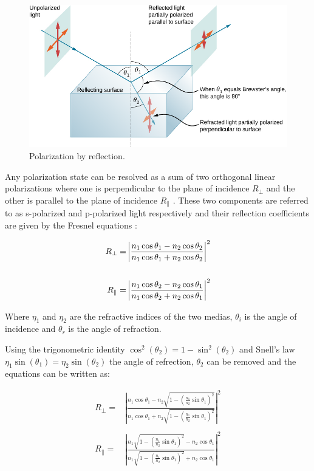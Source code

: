 \begin{figure}[H]
    \centering
    \includegraphics[width=\textwidth]{figures/polarization/reflaction.png}
    \caption{Polarization by reflection. \cite[Figure 1.38]{lingUniversityPhysicsVolume2016}}
    \label{fig:polarized_reflection}
\end{figure}


Any polarization state can be resolved as a sum of two orthogonal linear polarizations where one is perpendicular to the plane of incidence $R_\perp$ and the other is parallel to the plane of incidence $R_\parallel$ \cite{FresnelEquations2023}.
These two components are referred to as s-polarized and p-polarized light respectively and their reflection coefficients are given by the Fresnel equations \cite{FresnelEquations2023}:

\begin{align}
    \centering
    R_\perp =         & \left|{\frac {n_{1}\cos \theta _1-n_{2}\cos \theta _2}{n_{1}\cos \theta _1+n_{2}\cos \theta _2}}\right|^{2} \\
    \\
    R_\parallel     = & \left|{\frac {n_{1}\cos \theta _2-n_{2}\cos \theta _1}{n_{1}\cos \theta _2+n_{2}\cos \theta _1}}\right|^{2}
\end{align}

Where  $\eta_1$ and $\eta_2$ are the refractive indices of the two medias,
$\theta_i$ is the angle of incidence and $\theta_r$ is the angle of refraction.

Using the trigonometric identity $ \cos^2{\left(\theta_2 \right)} = 1- \sin^2{\left(\theta_2 \right)}$ and Snell's law $\eta_1 \sin{\left(\theta_1 \right)} = \eta_2 \sin{\left(\theta_2 \right)}$ the angle of refrection, $\theta_2$ can be removed and the equations can be written as:

\begin{align}
    R_\perp =         & \left|{\frac {n_{1}\cos \theta _1-n_{2}{\sqrt {1-\left({\frac {n_{1}}{n_{2}}}\sin \theta _1\right)^{2}}}}{n_{1}\cos \theta _1+n_{2}{\sqrt {1-\left({\frac {n_{1}}{n_{2}}}\sin \theta _1\right)^{2}}}}}\right|^{2} \\
    \\
    R_\parallel     = & \left|{\frac {n_{1}{\sqrt {1-\left({\frac {n_{1}}{n_{2}}}\sin \theta _1\right)^{2}}}-n_{2}\cos \theta _1}{n_{1}{\sqrt {1-\left({\frac {n_{1}}{n_{2}}}\sin \theta _1\right)^{2}}}+n_{2}\cos \theta _1}}\right|^{2}
\end{align}



